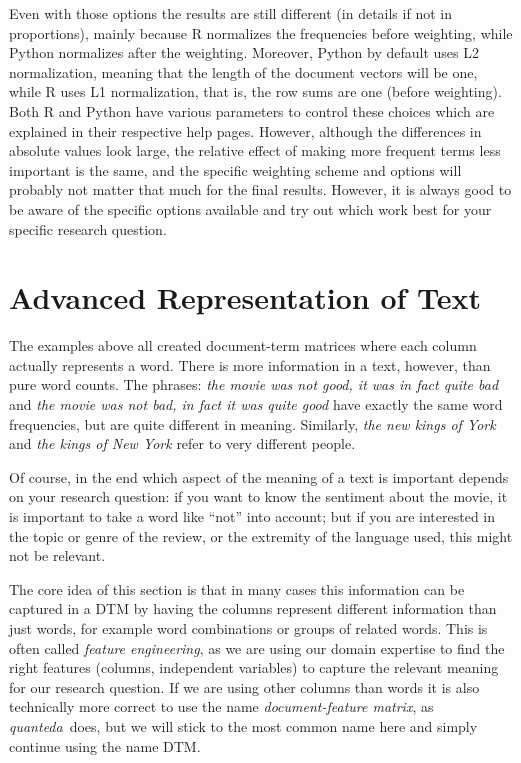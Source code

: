 Even with those options the results are still different (in details if not in proportions),
mainly because R normalizes the frequencies before weighting, while Python normalizes after the weighting.
Moreover, Python by default uses L2 normalization, meaning that the length of the document vectors will be one,
while R uses L1 normalization, that is, the row sums are one (before weighting).
Both R and Python have various parameters to control these choices which are explained in their respective help pages.
However, although the differences in absolute values look large, the relative effect of making more frequent terms less important is the same,
and the specific weighting scheme and options will probably not matter that much for the final results.
However, it is always good to be aware of the specific options available and try out which work best for your specific research question.




%

\section{Advanced Representation of Text}
\label{sec:ngram}

The examples above all created document-term matrices where each column actually represents a word.
There is more information in a text, however, than pure word counts.
The phrases: \emph{the movie was not good, it was in fact quite bad} and \emph{the movie was not bad, in fact it was quite good}
have exactly the same word frequencies, but are quite different in meaning.
Similarly, \emph{the new kings of York} and \emph{the kings of New York} refer to very different people.

Of course, in the end which aspect of the meaning of a text is important depends on your research question:
if you want to know the sentiment about the movie, it is important to take a word like ``not'' into account;
but if you are interested in the topic or genre of the review, or the extremity of the language used, this might not be relevant.

The core idea of this section is that in many cases this information can be captured in a DTM by having the columns represent different information than just words, for example word combinations or groups of related words.
This is often called \emph{feature engineering}, as we are using our domain expertise to find the right features (columns, independent variables) to capture the relevant meaning for our research question.
If we are using other columns than words it is also technically more correct to use the name \emph{document-feature matrix}, as \emph{quanteda}\ does, but we will stick to the most common name here and simply continue using the name DTM.

